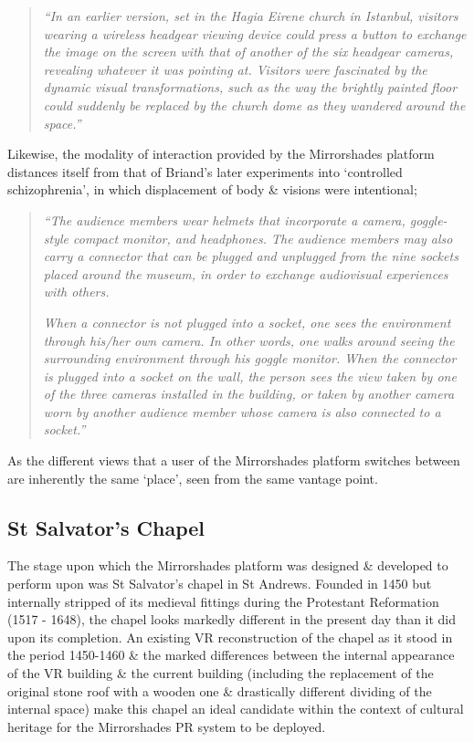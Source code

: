 \begin{quote}
	\textit{``In an earlier version, set in the Hagia Eirene church in Istanbul, visitors wearing a wireless headgear viewing device could press a button to exchange the image on the screen with that of another of the six headgear cameras, revealing whatever it was pointing at. Visitors were fascinated by the dynamic visual transformations, such as the way the brightly painted floor could suddenly be replaced by the church dome as they wandered around the space.''}~\cite{Jones2006}
\end{quote}

Likewise, the modality of interaction provided by the Mirrorshades platform distances itself from that of Briand's later experiments into `controlled schizophrenia', in which displacement of body \& visions were intentional;

\begin{quote}
	\textit{``The audience members wear helmets that incorporate a camera, goggle-style compact monitor, and headphones. The audience members may also carry a connector that can be plugged and unplugged from the nine sockets placed around the museum, in order to exchange audiovisual experiences with others.}

	\textit{When a connector is not plugged into a socket, one sees the environment through his/her own camera. In other words, one walks around seeing the surrounding environment through his goggle monitor. When the connector is plugged into a socket on the wall, the person sees the view taken by one of the three cameras installed in the building, or taken by another camera worn by another audience member whose camera is also connected to a socket.''}~\cite{Jones2006}
\end{quote}

As the different views that a user of the Mirrorshades platform switches between are inherently the same `place', seen from the same vantage point.


\subsection{St Salvator's Chapel}

The stage upon which the Mirrorshades platform was designed \& developed to perform upon was St Salvator's chapel in St Andrews. Founded in 1450 but internally stripped of its medieval fittings during the Protestant Reformation (1517 - 1648), the chapel looks markedly different in the present day than it did upon its completion. An existing VR reconstruction of the chapel as it stood in the period 1450-1460 \& the marked differences between the internal appearance of the VR building \& the current building (including the replacement of the original stone roof with a wooden one \& drastically different dividing of the internal space) make this chapel an ideal candidate within the context of cultural heritage for the Mirrorshades PR system to be deployed.

